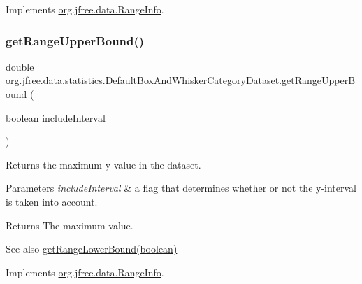 Implements \mbox{\hyperlink{interfaceorg_1_1jfree_1_1data_1_1_range_info_ab0187015bbe75ca00a62a71de72c1a1d}{org.\+jfree.\+data.\+Range\+Info}}.

\mbox{\label{classorg_1_1jfree_1_1data_1_1statistics_1_1_default_box_and_whisker_category_dataset_a32f1be24a5e0f73dd538f73ee8c4bd40}} 
\subsubsection{\texorpdfstring{get\+Range\+Upper\+Bound()}{getRangeUpperBound()}}
{\footnotesize\ttfamily double org.\+jfree.\+data.\+statistics.\+Default\+Box\+And\+Whisker\+Category\+Dataset.\+get\+Range\+Upper\+Bound (\begin{DoxyParamCaption}\item[{boolean}]{include\+Interval }\end{DoxyParamCaption})}

Returns the maximum y-\/value in the dataset.


\begin{DoxyParams}{Parameters}
{\em include\+Interval} & a flag that determines whether or not the y-\/interval is taken into account.\\
\hline
\end{DoxyParams}
\begin{DoxyReturn}{Returns}
The maximum value.
\end{DoxyReturn}
\begin{DoxySeeAlso}{See also}
\mbox{\hyperlink{classorg_1_1jfree_1_1data_1_1statistics_1_1_default_box_and_whisker_category_dataset_a29a3b0a95d9a09ab05cf0063254a5025}{get\+Range\+Lower\+Bound(boolean)}} 
\end{DoxySeeAlso}


Implements \mbox{\hyperlink{interfaceorg_1_1jfree_1_1data_1_1_range_info_a85987bb398c50351d190b2b888ff3348}{org.\+jfree.\+data.\+Range\+Info}}.

\mbox{\label{classorg_1_1jfree_1_1data_1_1statistics_1_1_default_box_and_whisker_category_dataset_ad7b6f1dc5d0b2641c579d88d0604bb7b}} 
